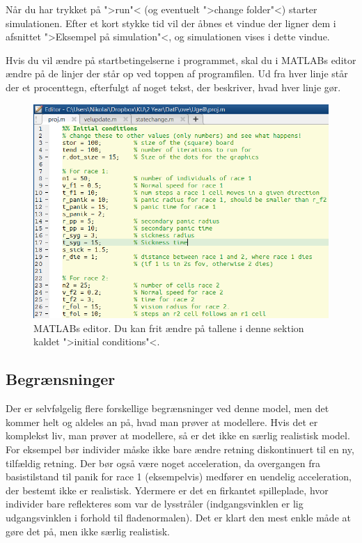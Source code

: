 \documentclass[a4paper,10pt]{article} 	%
\numberwithin{equation}{section}
\begin{document}
	Når du har trykket på ">run"< (og eventuelt ">change folder"<) starter simulationen. Efter et kort stykke tid vil der åbnes et vindue der ligner dem i afsnittet ">Eksempel på simulation"<, og simulationen vises i dette vindue.
	
	Hvis du vil ændre på startbetingelserne i programmet, skal du i MATLABs editor ændre på de linjer der står op ved toppen af programfilen. Ud fra hver linje står der et procenttegn, efterfulgt af noget tekst, der beskriver, hvad hver linje gør.
	
	\begin{figure}[H]
		\centering
		\includegraphics[width=12cm]{img/editor.png}
		\caption{MATLABs editor. Du kan frit ændre på tallene i denne sektion kaldet ">initial conditions"<.}
		\label{fig_editor}
	\end{figure}
	
	\subsection{Begrænsninger}
	Der er selvfølgelig flere forskellige begrænsninger ved denne model, men det kommer helt og aldeles an på, hvad man prøver at modellere. Hvis det er komplekst liv, man prøver at modellere, så er det ikke en særlig realistisk model. For eksempel bør individer måske ikke bare ændre retning diskontinuert til en ny, tilfældig retning. Der bør også være noget acceleration, da overgangen fra basistilstand til panik for race 1 (eksempelvis) medfører en uendelig acceleration, der bestemt ikke er realistisk. Ydermere er det en firkantet spilleplade, hvor individer bare reflekteres som var de lysstråler (indgangsvinklen er lig udgangsvinklen i forhold til fladenormalen). Det er klart den mest enkle måde at gøre det på, men ikke særlig realistisk.
	
\end{document}
